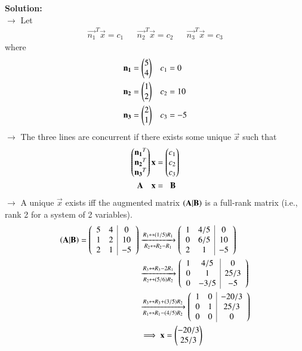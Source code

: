 \documentclass[journal]{IEEEtran}
\begin{document}
\textbf{Solution:}\\
$\rightarrow$ Let
\begin{align*}
    \vec{n_1}^T\vec{x} = c_1 && \vec{n_2}^T\vec{x} = c_2 && \vec{n_3}^T\vec{x} = c_3
\end{align*}
\hspace{0.3cm} where
\begin{align}
    \mathbf{n_1} = \begin{pmatrix}5\\4\end{pmatrix} && c_1 &= 0 \\
    \mathbf{n_2} = \begin{pmatrix}1\\2\end{pmatrix} && c_2 &= 10 \\
    \mathbf{n_3} = \begin{pmatrix}2\\1\end{pmatrix} && c_3 &= -5
\end{align}
$\rightarrow$ The three lines are concurrent if there exists some unique $\vec{x}$ such that
\begin{align}
    \begin{pmatrix}\mathbf{n_1}^T\\\mathbf{n_2}^T\\\mathbf{n_3}^T\end{pmatrix} \mathbf{x} &= \begin{pmatrix}c_1\\c_2\\c_3\end{pmatrix} \\
    \mathbf{A}\hspace{0.35cm}\mathbf{x} &= \hspace{0.2cm}\mathbf{B}
\end{align}
$\rightarrow$ A unique $\vec{x}$ exists iff the augmented matrix $\left(\mathbf{A}|\mathbf{B}\right)$ is a full-rank matrix (i.e., rank 2 for a system of 2 variables).
\begin{align}
    \left(\mathbf{A}|\mathbf{B}\right) = \left(\begin{array}{cc|c}5&4&0\\1&2&10\\2&1&-5\end{array}\right)
    &\xrightarrow[R_2 \leftrightarrow R_2 - R_1]{R_1 \leftrightarrow (1/5)R_1} \left(\begin{array}{cc|c}1&4/5&0\\0&6/5&10\\2&1&-5\end{array}\right) \\
    &\xrightarrow[R_2 \leftrightarrow (5/6)R_2]{R_3 \leftrightarrow R_3 - 2R_1} \left(\begin{array}{cc|c}1&4/5&0\\0&1&25/3\\0&-3/5&-5\end{array}\right) \\
    &\xrightarrow[R_1 \leftrightarrow R_1 - (4/5)R_2]{R_3 \leftrightarrow R_3 + (3/5)R_2} \left(\begin{array}{cc|c}1&0&-20/3\\0&1&25/3\\0&0&0\end{array}\right) \\
    &\implies \mathbf{x} = \begin{pmatrix}-20/3\\25/3\end{pmatrix}
\end{align}
\end{document}
